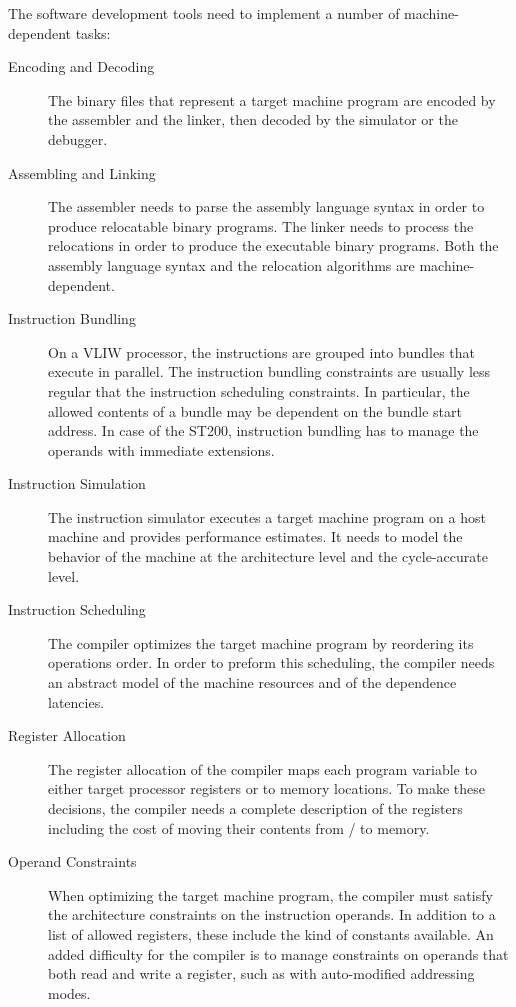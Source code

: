 \documentclass[11pt,a4paper]{article}
\begin{document}
The software development tools need to implement a number of machine-dependent
tasks: \begin{description}

\item[Encoding and Decoding] The binary files that represent a target machine
program are encoded by the assembler and the linker, then decoded by the
simulator or the debugger.

\item[Assembling and Linking] The assembler needs to parse the assembly language
syntax in order to produce relocatable binary programs. The linker needs to
process the relocations in order to produce the executable binary programs. Both
the assembly language syntax and the relocation algorithms are
machine-dependent.

\item[Instruction Bundling] On a VLIW processor, the instructions are grouped
into bundles that execute in parallel. The instruction bundling constraints are
usually less regular that the instruction scheduling constraints. In particular,
the allowed contents of a bundle may be dependent on the bundle start address.
In case of the ST200, instruction bundling has to manage the operands with
immediate extensions.

\item[Instruction Simulation] The instruction simulator executes a target
machine program on a host machine and provides performance estimates. It needs
to model the behavior of the machine at the architecture level and the
cycle-accurate level.

\item[Instruction Scheduling] The compiler optimizes the target machine program
by reordering its operations order. In order to preform this scheduling, the
compiler needs an abstract model of the machine resources and of the dependence
latencies.

\item[Register Allocation] The register allocation of the compiler maps each
program variable to either target processor registers or to memory locations. To
make these decisions, the compiler needs a complete description of the registers
including the cost of moving their contents from / to memory.

\item[Operand Constraints] When optimizing the target machine program, the
compiler must satisfy the architecture constraints on the instruction operands.
In addition to a list of allowed registers, these include the kind of constants
available. An added difficulty for the compiler is to manage constraints on
operands that both read and write a register, such as with auto-modified
addressing modes.


\end{description}
\end{document}
